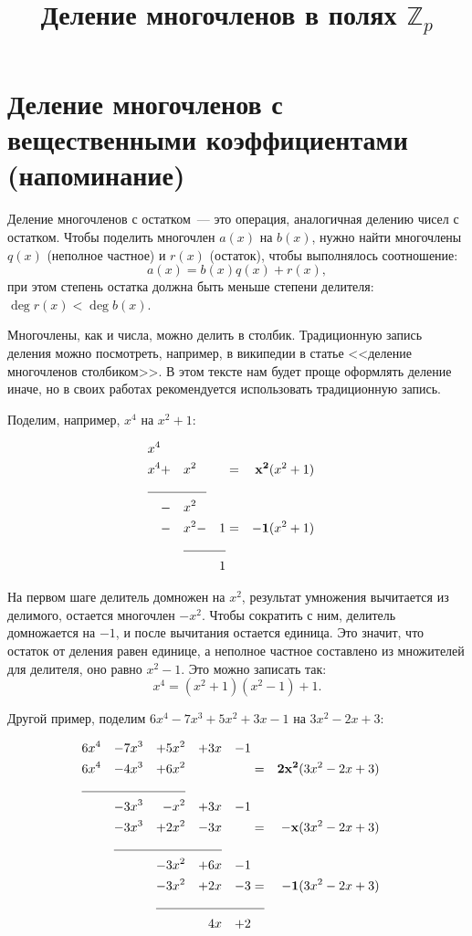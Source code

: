 \documentclass{article}
\title{Деление многочленов в полях $\mathbb{Z}_p$}
\author{}
\date{}
\begin{document}
\maketitle

\section{Деление многочленов с вещественными коэффициентами (напоминание)}

Деление многочленов с остатком~--- это операция, аналогичная делению чисел с остатком. Чтобы поделить многочлен $a(x)$ на $b(x)$, нужно найти многочлены $q(x)$ (неполное частное) и $r(x)$ (остаток), чтобы выполнялось соотношение:
$$a(x) = b(x)q(x)+r(x),$$
при этом степень остатка должна быть меньше степени делителя: $\deg r(x) < \deg b(x)$.

Многочлены, как и числа, можно делить в столбик. Традиционную запись деления можно посмотреть, например, в википедии в статье <<деление многочленов столбиком>>. В этом тексте нам будет проще оформлять деление иначе, но в своих работах рекомендуется использовать традиционную запись.

Поделим, например, $x^4$ на $x^2 + 1$:

\begin{alignat*}{7}
x^4\\
x^4&+&x^2&& &=&\mathbf{x^2}&(x^2 + 1)\\
\cline{1-4}
&-&x^2\\
&-&x^2 &-&1 &=&\mathbf{-1}&(x^2 + 1)\\
\cline{3-5}
&& &&1
\end{alignat*}

На первом шаге делитель домножен на $x^2$, результат умножения вычитается из делимого, остается многочлен $-x^2$. Чтобы сократить с ним, делитель домножается на $-1$, и после вычитания остается единица. Это значит, что остаток от деления равен единице, а неполное частное составлено из множителей для делителя, оно равно $x^2-1$. Это можно записать так:
$$x^4=(x^2 + 1)(x^2 - 1) + 1.$$

Другой пример, поделим $6x^4-7x^3+5x^2+3x-1$ на $3x^2-2x+3$:

\begin{alignat*}{11}
6&x^4&-7&x^3&+5&x^2&+3&x&-1\\
6&x^4&-4&x^3&+6&x^2&&&&=&\mathbf{2x^2}&(3x^2-2x+3)\\
\cline{1-6}
&&-3&x^3&-&x^2&+3&x&-1\\
&&-3&x^3&+2&x^2&-3&x&&=&\mathbf{-x}&(3x^2-2x+3)\\
\cline{3-8}
&&&&-3&x^2&+6&x&-1\\
&&&&-3&x^2&+2&x&-3&=&\mathbf{-1}&(3x^2-2x+3)\\
\cline{5-10}
&&&&&&4&x&+2\\
\end{alignat*}
\end{document}
